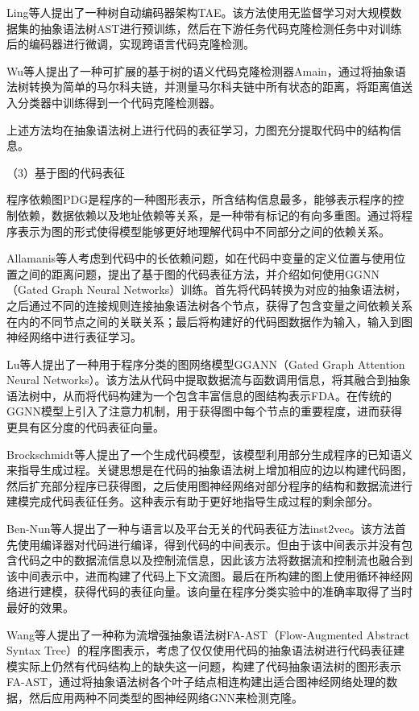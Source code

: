 Ling等人\cite{Ling2022ImproveRF}提出了一种树自动编码器架构TAE。该方法使用无监督学习对大规模数据集的抽象语法树AST进行预训练，然后在下游任务代码克隆检测任务中对训练后的编码器进行微调，实现跨语言代码克隆检测。

Wu等人\cite{10.1145/3551349.3560426}提出了一种可扩展的基于树的语义代码克隆检测器Amain，通过将抽象语法树转换为简单的马尔科夫链，并测量马尔科夫链中所有状态的距离，将距离值送入分类器中训练得到一个代码克隆检测器。

上述方法均在抽象语法树上进行代码的表征学习，力图充分提取代码中的结构信息。

（3）基于图的代码表征

程序依赖图PDG是程序的一种图形表示，所含结构信息最多，能够表示程序的控制依赖，数据依赖以及地址依赖等关系，是一种带有标记的有向多重图。通过将程序表示为图的形式使得模型能够更好地理解代码中不同部分之间的依赖关系。

Allamanis等人\cite{Allamanis2017LearningTR}考虑到代码中的长依赖问题，如在代码中变量的定义位置与使用位置之间的距离问题，提出了基于图的代码表征方法，并介绍如何使用GGNN（Gated Graph Neural Networks）训练。首先将代码转换为对应的抽象语法树，之后通过不同的连接规则连接抽象语法树各个节点，获得了包含变量之间依赖关系在内的不同节点之间的关联关系；最后将构建好的代码图数据作为输入，输入到图神经网络中进行表征学习。

Lu等人\cite{Lu2019ProgramCU}提出了一种用于程序分类的图网络模型GGANN（Gated Graph Attention Neural Networks）。该方法从代码中提取数据流与函数调用信息，将其融合到抽象语法树中，从而将代码构建为一个包含丰富信息的图结构表示FDA。在传统的GGNN模型上引入了注意力机制，用于获得图中每个节点的重要程度，进而获得更具有区分度的代码表征向量。

Brockschmidt等人\cite{Brockschmidt2018GenerativeCM}提出了一个生成代码模型，该模型利用部分生成程序的已知语义来指导生成过程。关键思想是在代码的抽象语法树上增加相应的边以构建代码图，然后扩充部分程序已获得图，之后使用图神经网络对部分程序的结构和数据流进行建模完成代码表征任务。这种表示有助于更好地指导生成过程的剩余部分。

Ben-Nun等人\cite{10.5555/3327144.3327276}提出了一种与语言以及平台无关的代码表征方法inst2vec。该方法首先使用编译器对代码进行编译，得到代码的中间表示。但由于该中间表示并没有包含代码之中的数据流信息以及控制流信息，因此该方法将数据流和控制流也融合到该中间表示中，进而构建了代码上下文流图。最后在所构建的图上使用循环神经网络进行建模，获得代码的表征向量。该向量在程序分类实验中的准确率取得了当时最好的效果。

Wang等人\cite{9054857}提出了一种称为流增强抽象语法树FA-AST（Flow-Augmented Abstract Syntax Tree）的程序图表示，考虑了仅仅使用代码的抽象语法树进行代码表征建模实际上仍然有代码结构上的缺失这一问题，构建了代码抽象语法树的图形表示FA-AST，通过将抽象语法树各个叶子结点相连构建出适合图神经网络处理的数据，然后应用两种不同类型的图神经网络GNN来检测克隆。

